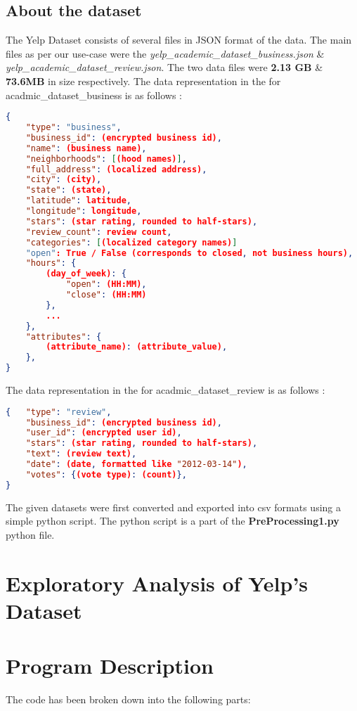 \documentclass[paper=a4, fontsize=11pt]{scrartcl} %
\numberwithin{equation}{section} %
\numberwithin{figure}{section} %
\numberwithin{table}{section} %
\begin{document}
\subsection{About the dataset}
The Yelp Dataset consists of several files in JSON format of the data. The main files as per our use-case were the \textit{yelp\_academic\_dataset\_business.json} \& \textit{yelp\_academic\_dataset\_review.json}. The two data files were \textbf{2.13 GB} \& \textbf{73.6MB} in size respectively. The data representation in the for acadmic\_dataset\_business is as follows : \\
\begin{lstlisting}[language=json]
{
    "type": "business",
    "business_id": (encrypted business id),
    "name": (business name),
    "neighborhoods": [(hood names)],
    "full_address": (localized address),
    "city": (city),
    "state": (state),
    "latitude": latitude,
    "longitude": longitude,
    "stars": (star rating, rounded to half-stars),
    "review_count": review count,
    "categories": [(localized category names)]
    "open": True / False (corresponds to closed, not business hours),
    "hours": {
        (day_of_week): {
            "open": (HH:MM),
            "close": (HH:MM)
        },
        ...
    },
    "attributes": {
        (attribute_name): (attribute_value),
    },
}
\end{lstlisting}
The data representation in the for acadmic\_dataset\_review is as follows : \\
\begin{lstlisting}[language=json]
{   "type": "review",
    "business_id": (encrypted business id),
    "user_id": (encrypted user id),
    "stars": (star rating, rounded to half-stars),
    "text": (review text),
    "date": (date, formatted like "2012-03-14"),
    "votes": {(vote type): (count)},
}
\end{lstlisting}
The given datasets were first converted and exported into csv formats using a simple python script. The python script is a part of the \textbf{PreProcessing1.py} python file.

\section{Exploratory Analysis of Yelp's Dataset}

\section{Program Description}
The code has been broken down into the following parts:
\end{document}
